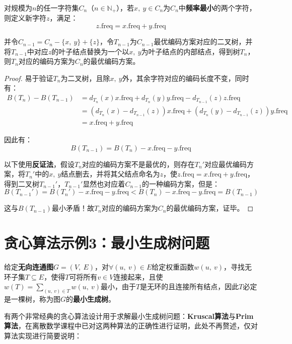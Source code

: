 \documentclass[12pt,a4paper,violet,oneside]{bbe}
\begin{document}
\begin{lemma}
	对规模为$n$的任一字符集$C_n$（$n\in\mathbb{N}_+$），若$x,~y\in C_n$为$C_n$中\textbf{频率最小}的两个字符，则定义新字符$z$，满足：
	$$
	z.\text{freq}=x.\text{freq}+y.\text{freq}
	$$
	
	并令$C_{n-1}=C_n-\{x,~y\}+\{z\}$，令$T_{n-1}$为$C_{n-1}$最优编码方案对应的二叉树，并将$T_{n-1}$中对应$z$的叶子结点替换为一个以$x,~y$为叶子结点的内部结点，得到树$T_n$，则$T_n$对应的编码方案为$C_n$的最优编码方案。
\end{lemma}
\begin{proof}
	易于验证$T_n$为二叉树，且除$x,~y$外，其余字符对应的编码长度不变，同时有：
	$$
	\begin{array}{rl}
		B(T_n)-B(T_{n-1})&=d_{T_n}(x)x.\text{freq}+d_{T_n}(y)y.\text{freq}-d_{T_{n-1}}(z)z.\text{freq}\\
		&=(d_{T_n}(x)-d_{T_{n-1}}(z))x.\text{freq}+(d_{T_n}(y)-d_{T_{n-1}}(z))y.\text{freq}\\
		&=x.\text{freq}+y.\text{freq}
	\end{array}
	$$
	
	因此有：
	$$
	B(T_{n-1})=B(T_n)-x.\text{freq}-y.\text{freq}
	$$
	
	以下使用\textbf{反证法}，假设$T_n$对应的编码方案不是最优的，则存在$T_{n}'$对应最优编码方案，将$T_n'$中的$x,~y$结点删去，并将其父结点命名为$z$，使$z.\text{freq}=x.\text{freq}+y.\text{freq}$，得到二叉树$T_{n-1}'$，$T_{n-1}'$显然也对应着$C_{n-1}$的一种编码方案，但是：
	$$
	B(T_{n-1}')=B(T_n')-x.\text{freq}-y.\text{freq}<B(T_n)-x.\text{freq}-y.\text{freq}=B(T_{n-1})
	$$
	
	这与$B(T_{n-1})$最小矛盾！故$T_n$对应的编码方案为$C_n$的最优编码方案，证毕。
\end{proof}
\section{贪心算法示例3：最小生成树问题}
\begin{example}
	给定\textbf{无向连通图}$G=(V,~E)$，对$\forall (u,~v)\in E$给定权重函数$w(u,~v)$，寻找无环子集$T\subseteq E$，使得$T$可将所有$v\in V$连接起来，且使$w(T)=\sum\limits_{(u,~v)\in T}w(u,~v)$最小，由于$T$是无环的且连接所有结点，因此$T$必定是一棵树，称为图$G$的\textbf{最小生成树}。
\end{example}


有两个非常经典的贪心算法设计用于求解最小生成树问题：\textbf{Kruscal算法}与\textbf{Prim算法}，在离散数学课程中已对这两种算法的正确性进行证明，此处不再赘述，仅对算法实现进行简要说明：
\end{document}
